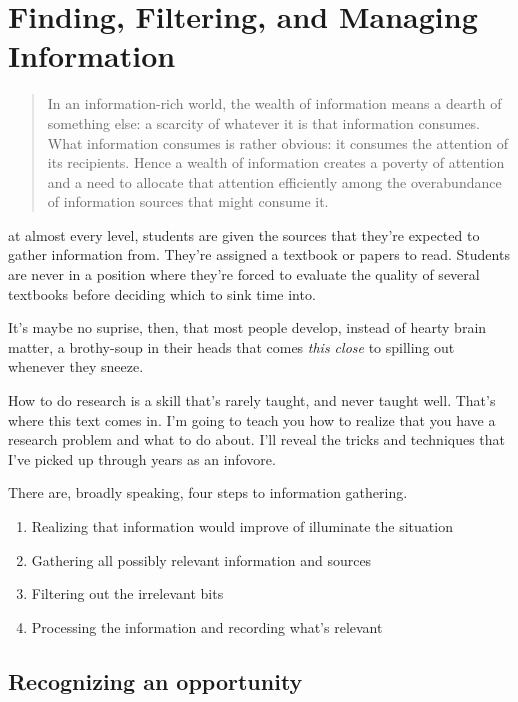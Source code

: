 \chapter{Finding, Filtering, and Managing Information}
\begin{quote}
  In an information-rich world, the wealth of information means a dearth of something else: a scarcity of whatever it is that information consumes. What information consumes is rather obvious: it consumes the attention of its recipients. Hence a wealth of information creates a poverty of attention and a need to allocate that attention efficiently among the overabundance of information sources that might consume it.
\end{quote}

 at almost every level, students are given the sources that they're expected to gather information from. They're assigned a textbook or papers to read. Students are never in a position where they're forced to evaluate the quality of several textbooks before deciding which to sink time into.

It's maybe no suprise, then, that most people develop, instead of hearty brain matter, a brothy-soup in their heads that comes \textit{this close} to spilling out whenever they sneeze.

How to do research is a skill that's rarely taught, and never taught
well. That's where this text comes in. I'm going to teach you how to realize
that you have a research problem and what to do about. I'll reveal the tricks
and techniques that I've picked up through years as an infovore.

There are, broadly speaking, four steps to information gathering.

\begin{enumerate}
  \item Realizing that information would improve of illuminate the situation
  \item Gathering all possibly relevant information and sources
  \item Filtering out the irrelevant bits
  \item Processing the information and recording what's relevant
\end{enumerate}

\section{Recognizing an opportunity}

